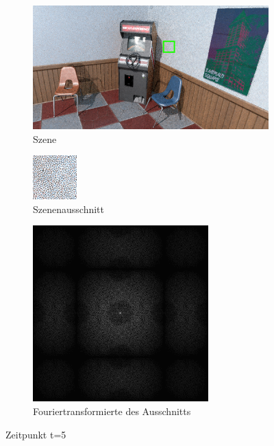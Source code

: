 \begin{figure}[H]
    \begin{subfigure}{\textwidth}   
        \centering \includegraphics[scale=.25]{content/TemporalerAlg/Bilder/Sorting/Szene/Szene5.png}
        \caption{Szene}
        \label{fig:Nur_Sorting_Szene_t5}
    \end{subfigure}
    \begin{subfigure}{0.5\textwidth}
        \centering\includegraphics[width=0.4\linewidth]{content/TemporalerAlg/Bilder/Sorting/Ausschnitte/Ausschnitt5.png} 
        \caption{Szenenausschnitt}
        \label{fig:Nur_Sorting_ausschnitt_t5}
    \end{subfigure}
    \begin{subfigure}{0.5\textwidth}
        \centering\includegraphics[width=0.4\linewidth]{content/TemporalerAlg/Bilder/Sorting//Spektren/Ausschnitt5.png}
        \caption{Fouriertransformierte des Ausschnitts}
        \label{fig:Nur_Sorting_Fouriertransformierte_t5}
    \end{subfigure}
        \caption{Zeitpunkt t=5}
        \label{fig:Nur_Sorting_Verlauf_t5}
\end{figure}

